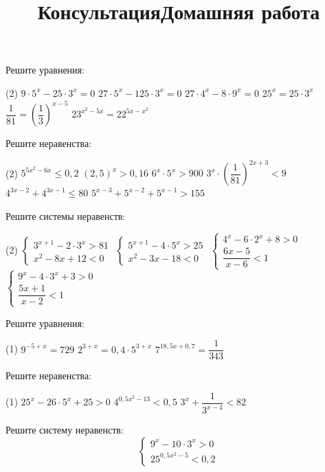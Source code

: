 \begin{consultation}
	\title{Консультация}
	\begin{listofex}
		\item Решите уравнения:
		\begin{tasks}(2)
			\task \( 9 \cdot 5^x - 25 \cdot 3^x =0 \)
			\task \( 27 \cdot 5^x - 125 \cdot 3^x = 0 \)
			\task \( 27 \cdot 4^x - 8 \cdot 9^x=0 \)
			\task \( 25^x= 25 \cdot 3^x \)
			\task \( \dfrac{1}{81} = \left( \dfrac{1}{3} \right)^{x-5} \)
			\task \( 23^{x^2-5x}=22^{5x-x^2} \)
		\end{tasks}
		\item Решите неравенства:
		\begin{tasks}(2)
			\task \( 5^{5x^2-6x} \le 0,2 \)
			\task \( (2,5)^x > 0,16 \)
			\task \( 6^x \cdot 5^x > 900 \)
			\task \( 3^x \cdot \left( \dfrac{1}{81} \right)^{2x+3} < 9 \)
			\task \( 4^{3x-2}+4^{3x-1} \le 80 \)
			\task \( 5^{x-3}+5^{x-2}+5^{x-1} > 155 \)
		\end{tasks}
		\item Решите системы неравенств:
		\begin{tasks}(2)
			\task \( \begin{cases} 3^{x+1}-2 \cdot 3^x > 81 \\ x^2-8x+12 < 0 \end{cases} \)
			\task \( \begin{cases} 5^{x+1} - 4 \cdot 5^x > 25 \\ x^2-3x-18 < 0 \end{cases} \)
			\task \( \begin{cases} 4^x - 6 \cdot 2^x + 8 > 0 \\ \dfrac{6x-5}{x-6} < 1 \end{cases} \)
			\task \( \begin{cases} 9^x - 4 \cdot 3^x + 3 > 0 \\ \dfrac{5x+1}{x-2} < 1 \end{cases} \)
		\end{tasks}
	\end{listofex}
	\newpage
	\title{Домашняя работа}
	\begin{listofex}
		\item Решите уравнения:
		\begin{tasks}(1)
			\task \( 9^{-5+x}=729 \)
			\task \( 2^{3+x}=0,4 \cdot 5^{3+x} \)
			\task \( 7^{18,5x+0,7}=\dfrac{1}{343} \)
		\end{tasks}
		\item Решите неравенства:
		\begin{tasks}(1)
			\task \( 25^x-26 \cdot 5^x + 25 >0 \)
			\task \( 4^{0,5x^2-13} < 0,5 \)
			\task \( 3^x + \dfrac{1}{3^{x-4}} < 82 \)
		\end{tasks}
		\item Решите систему неравенств: \[ \begin{cases} 9^x - 10 \cdot 3^x > 0 \\ 25^{0,5x^2-5} < 0,2 \end{cases} \]
	\end{listofex}
\end{consultation}
